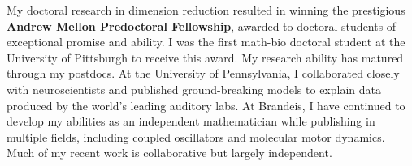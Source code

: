 My doctoral research in dimension reduction resulted in winning the prestigious \textbf{Andrew Mellon Predoctoral Fellowship}, awarded to doctoral students of exceptional promise and ability. I was the first math-bio doctoral student at the University of Pittsburgh to receive this award. My research ability has matured through my postdocs. At the University of Pennsylvania, I collaborated closely with neuroscientists and published ground-breaking models to explain data produced by the world's leading auditory labs. At Brandeis, I have continued to develop my abilities as an independent mathematician while publishing in multiple fields, including coupled oscillators and molecular motor dynamics. Much of my recent work is collaborative but largely independent.